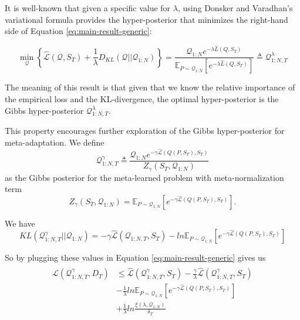 \documentclass{article}
\theoremstyle{definition}
\newcommand{\Expect}[2]{\mathbb{E}_{#1}\left [#2 \right ]}
\begin{document}
It is well-known that given a specific value for $\lambda$, using Donsker and Varadhan’s variational formula \citep{Donsker1975} provides the hyper-posterior that minimizes the right-hand side of Equation \ref{eq:main-result-generic}:

$$\min_{\mathcal{Q}} \left\{ \hat{\mathcal{L}}(\mathcal{Q}, S_T) + \frac{1}{\lambda}D_{KL}(\mathcal{Q}||\mathcal{Q}_{1:N}) \right\} = \frac{\mathcal{Q}_{1:N}e^{-\lambda\hat{L}(Q,S_T)}}{\Expect{P\sim \mathcal{Q}_{1:N}}{e^{-\lambda\hat{L}(Q,S_T)}}}\triangleq \mathcal{Q}^{\lambda}_{1:N,T}$$

The meaning of this result is that given that we know the relative importance of the empirical loss and the KL-divergence, the optimal hyper-posterior is the Gibbs hyper-posterior $\mathcal{Q}^{\lambda}_{1:N,T}$.

This property encourages further exploration of the Gibbs hyper-posterior for meta-adaptation. We define $$\mathcal{Q}^{\gamma}_{1:N,T}\triangleq \frac{\mathcal{Q}_{1:N}e^{-\gamma\hat{\mathcal{L}}(Q(P,S_T),S_T)}}{Z_\gamma(S_T, \mathcal{Q}_{1:N})}$$ as the Gibbs posterior for the meta-learned problem with meta-normalization term $$Z_\gamma(S_T, \mathcal{Q}_{1:N})=\Expect{P\sim \mathcal{Q}_{1:N}}{e^{-\gamma\hat{\mathcal{L}}(Q(P,S_T),S_T)}}.$$

We have 
$$KL(\mathcal{Q}^{\gamma}_{1:N,T}||\mathcal{Q}_{1:N})=
-\gamma\hat{\mathcal{L}}(\mathcal{Q}_{1:N,T}, S_T)-ln\Expect{P\sim \mathcal{Q}_{1:N}}{e^{-\gamma\hat{\mathcal{L}}(Q(P,S_T),S_T)}}$$ 

So by plugging these values in Equation \ref{eq:main-result-generic} gives us
\begin{align*} 
\begin{split}
\mathcal{L}(\mathcal{Q}^{\gamma}_{1:N,T}, D_T) & \leq \hat{\mathcal{L}}(\mathcal{Q}^{\gamma}_{1:N,T}, S_T) -\frac{\gamma}{\lambda}\hat{\mathcal{L}}(\mathcal{Q}^{\gamma}_{1:N,T}, S_T) \\ &- \frac{1}{\lambda}ln\Expect{P\sim \mathcal{Q}_{1:N}}{e^{-\gamma\hat{\mathcal{L}}(Q(P,S_T),S_T)}}\\ &+\frac{1}{\lambda}ln\frac{\xi(\lambda,\mathcal{Q}_{1:N})}{\delta_T}
\end{split}
\end{align*}
\end{document}
